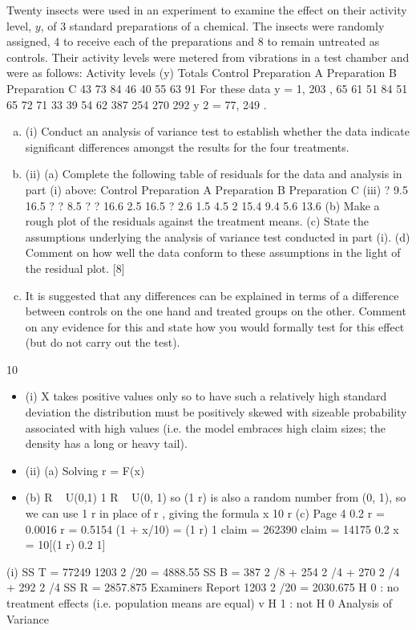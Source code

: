 \documentclass[a4paper,12pt]{article}
\begin{document}

Twenty insects were used in an experiment to examine the effect on their activity level, $y$, of 3 standard preparations of a chemical. The insects were randomly assigned, 4 to receive each of the preparations and 8 to remain untreated as controls.
Their activity levels were metered from vibrations in a test chamber and were as
follows:
Activity levels (y)
Totals
Control
Preparation A
Preparation B
Preparation C 43
73
84
46
40
55
63
91
For these data y = 1, 203 ,
65
61
51
84
51
65
72
71
33
39
54
62
387
254
270
292
y 2 = 77, 249 .
\begin{enumerate}[(a)]
\item (i) Conduct an analysis of variance test to establish whether the data indicate
significant differences amongst the results for the four treatments.
\item 
(ii) (a)
Complete the following table of residuals for the data and analysis in
part (i) above:
Control
Preparation A
Preparation B
Preparation C
(iii)
?
9.5
16.5
?
?
8.5
?
?
16.6
2.5
16.5
?
2.6
1.5
4.5
2
15.4
9.4
5.6 13.6
(b) Make a rough plot of the residuals against the treatment means.
(c) State the assumptions underlying the analysis of variance test
conducted in part (i).
(d) Comment on how well the data conform to these assumptions in the
light of the residual plot.
[8]
\item It is suggested that any differences can be explained in terms of a difference
between controls on the one hand and treated groups on the other.
Comment on any evidence for this and state how you would formally test for
this effect (but do not carry out the test).
\end{enumerate}

\newpage

10
\begin{itemize}
\item (i) X takes positive values only so to have such a relatively high standard deviation the distribution must be positively skewed with sizeable probability
associated with high values (i.e. the model embraces high claim sizes; the density has a long or heavy tail).
\item (ii) (a) Solving r = F(x)
\item (b) R ~ U(0,1) 1 R ~ U(0, 1) so (1 r) is also a random number from (0, 1), so we can use 1 r in place of r , giving the formula
x 10 r
(c)
Page 4
0.2
r = 0.0016
r = 0.5154
(1 + x/10) = (1 r)
1
claim = 262390
claim = 14175
0.2
x = 10[(1
r)
0.2
1] 
\end{itemize}
(i)
SS T = 77249 1203 2 /20 = 4888.55
SS B = 387 2 /8 + 254 2 /4 + 270 2 /4 + 292 2 /4
SS R = 2857.875
Examiners Report
1203 2 /20 = 2030.675
H 0 : no treatment effects (i.e. population means are equal) v H 1 : not H 0
Analysis of Variance
\end{document}
